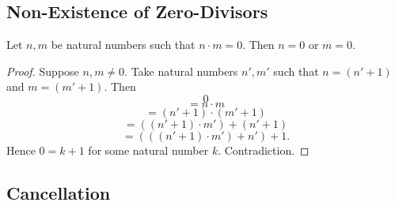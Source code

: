 \documentclass[10pt]{article}
\begin{document}
  \subsection{Non-Existence of Zero-Divisors}

  \begin{forthel}
    \begin{proposition}
      Let $n, m$ be natural numbers such that $n \cdot m = 0$.
      Then $n = 0$ or $m = 0$.
    \end{proposition}
    \begin{proof}
      Suppose $n, m \neq 0$.
      Take natural numbers $n', m'$ such that $n = (n' + 1)$ and $m = (m' + 1)$.
      Then
      \[  0                                     \]
      \[    = n \cdot m                         \]
      \[    = (n' + 1) \cdot (m' + 1)           \]
      \[    = ((n' + 1) \cdot m') + (n' + 1)    \]
      \[    = (((n' + 1) \cdot m') + n') + 1.   \]
      Hence $0 = k + 1$ for some natural number $k$.
      Contradiction.
    \end{proof}
  \end{forthel}


  \subsection{Cancellation}
\end{document}
